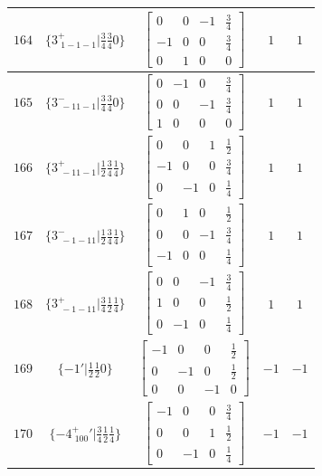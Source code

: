 \documentclass[fleqn,8pt]{jsarticle}
\begin{document}
\begin{longtable}{ccccc}
$ 164 $ & $ \{3^{+}_{\,\,1-1-1}|\frac{3}{4} \frac{3}{4} 0\} $ & $ \begin{bmatrix} 0 & 0 & -1 & \frac{3}{4} \\ -1 & 0 & 0 & \frac{3}{4} \\ 0 & 1 & 0 & 0 \end{bmatrix} $ & $ 1 $ & $ 1 $ \\ \hline
$ 165 $ & $ \{3^{-}_{\,\,-11-1}|\frac{3}{4} \frac{3}{4} 0\} $ & $ \begin{bmatrix} 0 & -1 & 0 & \frac{3}{4} \\ 0 & 0 & -1 & \frac{3}{4} \\ 1 & 0 & 0 & 0 \end{bmatrix} $ & $ 1 $ & $ 1 $ \\ \hline
$ 166 $ & $ \{3^{+}_{\,\,-11-1}|\frac{1}{2} \frac{3}{4} \frac{1}{4}\} $ & $ \begin{bmatrix} 0 & 0 & 1 & \frac{1}{2} \\ -1 & 0 & 0 & \frac{3}{4} \\ 0 & -1 & 0 & \frac{1}{4} \end{bmatrix} $ & $ 1 $ & $ 1 $ \\ \hline
$ 167 $ & $ \{3^{-}_{\,\,-1-11}|\frac{1}{2} \frac{3}{4} \frac{1}{4}\} $ & $ \begin{bmatrix} 0 & 1 & 0 & \frac{1}{2} \\ 0 & 0 & -1 & \frac{3}{4} \\ -1 & 0 & 0 & \frac{1}{4} \end{bmatrix} $ & $ 1 $ & $ 1 $ \\ \hline
$ 168 $ & $ \{3^{+}_{\,\,-1-11}|\frac{3}{4} \frac{1}{2} \frac{1}{4}\} $ & $ \begin{bmatrix} 0 & 0 & -1 & \frac{3}{4} \\ 1 & 0 & 0 & \frac{1}{2} \\ 0 & -1 & 0 & \frac{1}{4} \end{bmatrix} $ & $ 1 $ & $ 1 $ \\ \hline
$ 169 $ & $ \{-1{}'|\frac{1}{2} \frac{1}{2} 0\} $ & $ \begin{bmatrix} -1 & 0 & 0 & \frac{1}{2} \\ 0 & -1 & 0 & \frac{1}{2} \\ 0 & 0 & -1 & 0 \end{bmatrix} $ & $ -1 $ & $ -1 $ \\ \hline
$ 170 $ & $ \{-4^{+}_{\,\,100}{}'|\frac{3}{4} \frac{1}{2} \frac{1}{4}\} $ & $ \begin{bmatrix} -1 & 0 & 0 & \frac{3}{4} \\ 0 & 0 & 1 & \frac{1}{2} \\ 0 & -1 & 0 & \frac{1}{4} \end{bmatrix} $ & $ -1 $ & $ -1 $ \\ \hline

\end{longtable}
\end{document}
